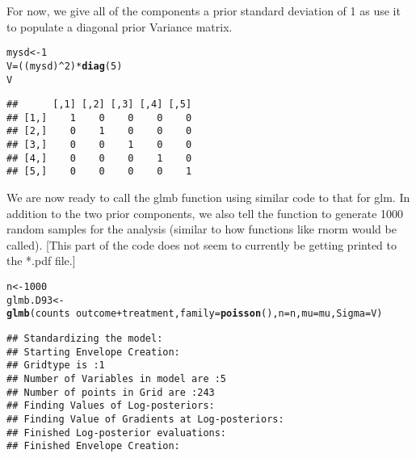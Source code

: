 \documentclass{article}\usepackage[]{graphicx}\usepackage[]{color}
\makeatletter
\newcommand{\hlnum}[1]{\textcolor[rgb]{0.686,0.059,0.569}{#1}}%
\newcommand{\hlopt}[1]{\textcolor[rgb]{0,0,0}{#1}}%
\newcommand{\hlstd}[1]{\textcolor[rgb]{0.345,0.345,0.345}{#1}}%
\newcommand{\hlkwb}[1]{\textcolor[rgb]{0.69,0.353,0.396}{#1}}%
\newcommand{\hlkwc}[1]{\textcolor[rgb]{0.333,0.667,0.333}{#1}}%
\newcommand{\hlkwd}[1]{\textcolor[rgb]{0.737,0.353,0.396}{\textbf{#1}}}%
\newenvironment{kframe}{%
 \def\at@end@of@kframe{}%
 \ifinner\ifhmode%
  \def\at@end@of@kframe{\end{minipage}}%
  \begin{minipage}{\columnwidth}%
 \fi\fi%
 \def\FrameCommand##1{\hskip\@totalleftmargin \hskip-\fboxsep
 \colorbox{shadecolor}{##1}\hskip-\fboxsep
     \hskip-\linewidth \hskip-\@totalleftmargin \hskip\columnwidth}%
 \MakeFramed {\advance\hsize-\width
   \@totalleftmargin\z@ \linewidth\hsize
   \@setminipage}}%
 {\par\unskip\endMakeFramed%
 \at@end@of@kframe}
\newenvironment{knitrout}{}{} %
\makeatother
\begin{document}
For now, we give all of the components a prior standard deviation of 1 as use it to populate a diagonal prior Variance matrix.

\begin{knitrout}
\color{fgcolor}\begin{kframe}
\begin{alltt}
\hlstd{mysd}\hlkwb{<-}\hlnum{1}
\hlstd{V}\hlkwb{=}\hlstd{((mysd)}\hlopt{^}\hlnum{2}\hlstd{)}\hlopt{*}\hlkwd{diag}\hlstd{(}\hlnum{5}\hlstd{)}
\hlstd{V}
\end{alltt}
\begin{verbatim}
##      [,1] [,2] [,3] [,4] [,5]
## [1,]    1    0    0    0    0
## [2,]    0    1    0    0    0
## [3,]    0    0    1    0    0
## [4,]    0    0    0    1    0
## [5,]    0    0    0    0    1
\end{verbatim}
\end{kframe}
\end{knitrout}

We are now ready to call the glmb function using similar code to that for glm. In addition to the two prior components, we also tell the function to generate 1000 random samples for the analysis (similar to how functions like rnorm would be called). [This part of the code does not seem to currently be getting printed to the *.pdf file.]

\begin{knitrout}
\color{fgcolor}\begin{kframe}
\begin{alltt}
\hlstd{n}\hlkwb{<-}\hlnum{1000}
\hlstd{glmb.D93}\hlkwb{<-}\hlkwd{glmb}\hlstd{(counts} \hlopt{~} \hlstd{outcome} \hlopt{+} \hlstd{treatment,}\hlkwc{family} \hlstd{=} \hlkwd{poisson}\hlstd{(),}\hlkwc{n}\hlstd{=n,}\hlkwc{mu}\hlstd{=mu,}\hlkwc{Sigma}\hlstd{=V)}
\end{alltt}
\begin{verbatim}
## Standardizing the model:
## Starting Envelope Creation:
## Gridtype is :1
## Number of Variables in model are :5
## Number of points in Grid are :243
## Finding Values of Log-posteriors:
## Finding Value of Gradients at Log-posteriors:
## Finished Log-posterior evaluations:
## Finished Envelope Creation:
\end{verbatim}
\end{kframe}
\end{knitrout}
\end{document}

